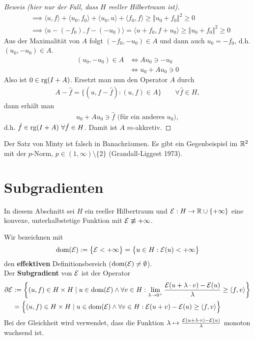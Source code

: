 \begin{proof}[Beweis (hier nur der Fall, dass $H$ reeller Hilbertraum ist)]
\begin{align*}
		&\implies
		\langle u,f\rangle +\langle u_0,f_0\rangle+\langle u_0,u\rangle+\langle f_0,f\rangle\geq\Vert u_0+f_0\Vert^2\geq0\\
		&\implies
		\big\langle u-(-f_0),f-(-u_0)\big\rangle=
		\big\langle u+f_0,f+u_0\big\rangle\geq\big\Vert u_0+f_0\Vert^2\geq0
	\end{align*}
	Aus der Maximalität von $A$ folgt $(-f_0,-u_0)\in A$ und dann auch $u_0=-f_0$, d.h.\\ $(u_0,-u_0)\in A$.
	\begin{align*}
		(u_0,-u_0)\in A
		&\Longleftrightarrow Au_0\ni -u_0\\
		&\Longleftrightarrow u_0+Au_0\ni 0
	\end{align*}
	Also ist $0\in\operatorname{rg}(I+A)$. 
	Ersetzt man nun den Operator $A$ durch
	\begin{align*}
		A-\hat{f}=\big\lbrace(u,f-\hat{f}):(u,f)\in A\big\rbrace\qquad\forall \hat{f}\in H,
	\end{align*}
	dann erhält man
	\begin{align*}
		u_0+Au_0\ni\hat{f}\text{ (für ein anderes $u_0$)},
	\end{align*}
	d.h. $\hat{f}\in\operatorname{rg}(I+A)~\forall\hat{f}\in H$. 
	Damit ist $A$ $m$-akkretiv.
\end{proof}

\begin{bemerkung}
	Der Satz von Minty ist falsch in Banachräumen. 
	Es gibt ein Gegenbeispiel im $\mathbb{R}^2$ mit der $p$-Norm, $p\in(1,\infty)\setminus\lbrace2\rbrace$ (Grandall-Liggest 1973).
\end{bemerkung}

\section{Subgradienten}
In diesem Abschnitt sei $H$ ein reeller Hilbertraum und $\mathcal{E}:H\to\mathbb{R}\cup\lbrace+\infty\rbrace$ eine konvexe, unterhalbstetige Funktion mit $\mathcal{E}\not\equiv+\infty$. 
\begin{definition}
	Wir bezeichnen mit
	\begin{align*}
		\operatorname{dom}(\mathcal{E}):=\big\lbrace\mathcal{E}<+\infty\big\rbrace=\big\lbrace u\in H:\mathcal{E}(u)<+\infty\big\rbrace
	\end{align*}
	den \textbf{effektiven} Definitionsbereich ($\operatorname{dom}(\mathcal{E})\neq\emptyset$).\\
	Der \textbf{Subgradient} von $\mathcal{E}$ ist der Operator
	\begin{align*}
		\partial\mathcal{E}&:=\left\lbrace (u,f)\in H\times H\mid u\in\operatorname{dom}(\mathcal{E})\wedge\forall v\in H:\lim\limits_{\lambda\to0^+}\frac{\mathcal{E}(u+\lambda\cdot v)-\mathcal{E}(u)}{\lambda}\geq\langle f,v\rangle\right\rbrace\\
		&=\Big\lbrace(u,f)\in H\times H\mid u\in\operatorname{dom}(\mathcal{E})\wedge\forall v\in H:\mathcal{E}(u+v)-\mathcal{E}(u)\geq\langle f,v\rangle\Big\rbrace
	\end{align*}
	Bei der Gleichheit wird verwendet, dass die Funktion $\lambda\mapsto\frac{\mathcal{E}(u + \lambda\cdot v)-\mathcal{E}(u)}{\lambda}$ monoton wachsend ist.
\end{definition}

